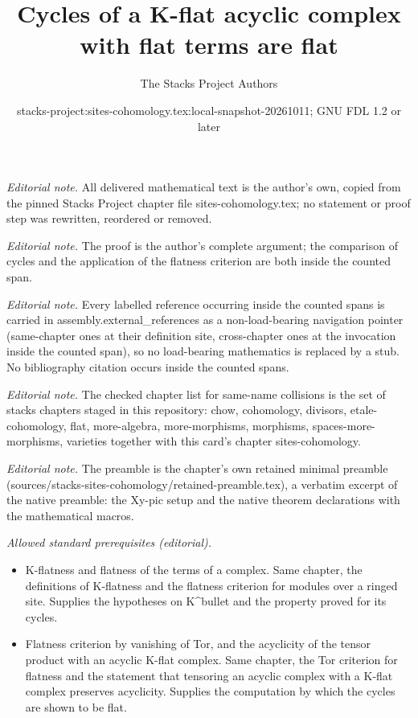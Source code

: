 \documentclass[10pt,a4paper]{amsart}
\title{Cycles of a K-flat acyclic complex with flat terms are flat}
\author{The Stacks Project Authors}
\date{stacks-project:sites-cohomology.tex:local-snapshot-20261011; GNU FDL 1.2 or later}
\theoremstyle{plain}
\theoremstyle{definition}
\theoremstyle{remark}
\numberwithin{equation}{subsection}
\begin{document}
\maketitle
\noindent\textit{Editorial note.} All delivered mathematical text is the author's own, copied from the pinned Stacks Project chapter file sites-cohomology.tex; no statement or proof step was rewritten, reordered or removed.\par\medskip
\noindent\textit{Editorial note.} The proof is the author's complete argument; the comparison of cycles and the application of the flatness criterion are both inside the counted span.\par\medskip
\noindent\textit{Editorial note.} Every labelled reference occurring inside the counted spans is carried in assembly.external\_references as a non-load-bearing navigation pointer (same-chapter ones at their definition site, cross-chapter ones at the invocation inside the counted span), so no load-bearing mathematics is replaced by a stub. No bibliography citation occurs inside the counted spans.\par\medskip
\noindent\textit{Editorial note.} The checked chapter list for same-name collisions is the set of stacks chapters staged in this repository: chow, cohomology, divisors, etale-cohomology, flat, more-algebra, more-morphisms, morphisms, spaces-more-morphisms, varieties together with this card's chapter sites-cohomology.\par\medskip
\noindent\textit{Editorial note.} The preamble is the chapter's own retained minimal preamble (sources/stacks-sites-cohomology/retained-preamble.tex), a verbatim excerpt of the native preamble: the Xy-pic setup and the native theorem declarations with the mathematical macros.\par\medskip
\noindent\textit{Allowed standard prerequisites (editorial).}\begin{itemize}
\item K-flatness and flatness of the terms of a complex. Same chapter, the definitions of K-flatness and the flatness criterion for modules over a ringed site. Supplies the hypotheses on K\textasciicircum{}bullet and the property proved for its cycles.
\item Flatness criterion by vanishing of Tor, and the acyclicity of the tensor product with an acyclic K-flat complex. Same chapter, the Tor criterion for flatness and the statement that tensoring an acyclic complex with a K-flat complex preserves acyclicity. Supplies the computation by which the cycles are shown to be flat.
\end{itemize}\medskip
\end{document}
